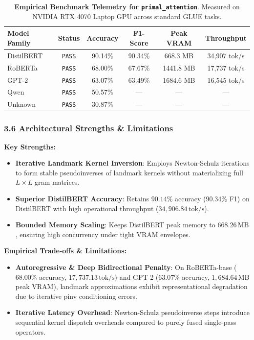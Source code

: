 \begin{table}[h]
\centering
\small
\caption{\textbf{Empirical Benchmark Telemetry for \texttt{primal\_attention}}. Measured on NVIDIA RTX 4070 Laptop GPU across standard GLUE tasks.}
\label{tab:telemetry_primal_attention}
\begin{tabular*}{\columnwidth}{@{\extracolsep{\fill}}lccccc}
\toprule
\textbf{Model Family} & \textbf{Status} & \textbf{Accuracy} & \textbf{F1-Score} & \textbf{Peak VRAM} & \textbf{Throughput} \\
\midrule
DistilBERT & \texttt{PASS} & 90.14\% & 90.34\% & 668.3 MB & 34,907 tok/s \\
RoBERTa & \texttt{PASS} & 68.00\% & 67.67\% & 1441.8 MB & 17,737 tok/s \\
GPT-2 & \texttt{PASS} & 63.07\% & 63.49\% & 1684.6 MB & 16,545 tok/s \\
Qwen & \texttt{PASS} & 50.57\% & --- & --- & --- \\
Unknown & \texttt{PASS} & 30.87\% & --- & --- & --- \\
\bottomrule
\end{tabular*}
\end{table}

\subsubsection*{3.6 Architectural Strengths \& Limitations}
\textbf{Key Strengths:}
\begin{itemize}
    \item \textbf{Iterative Landmark Kernel Inversion}: Employs Newton-Schulz iterations to form stable pseudoinverses of landmark kernels without materializing full $L \times L$ gram matrices.
    \item \textbf{Superior DistilBERT Accuracy}: Retains $90.14\%$ accuracy ($90.34\%$ F1) on DistilBERT with high operational throughput ($34,906.84\,\text{tok/s}$).
    \item \textbf{Bounded Memory Scaling}: Keeps DistilBERT peak memory to $668.26\,\text{MB}$, ensuring high concurrency under tight VRAM envelopes.
\end{itemize}

\textbf{Empirical Trade-offs \& Limitations:}
\begin{itemize}
    \item \textbf{Autoregressive \& Deep Bidirectional Penalty}: On RoBERTa-base ($68.00\%$ accuracy, $17,737.13\,\text{tok/s}$) and GPT-2 ($63.07\%$ accuracy, $1,684.64\,\text{MB}$ peak VRAM), landmark approximations exhibit representational degradation due to iterative pinv conditioning errors.
    \item \textbf{Iterative Latency Overhead}: Newton-Schulz pseudoinverse steps introduce sequential kernel dispatch overheads compared to purely fused single-pass operators.
\end{itemize}

